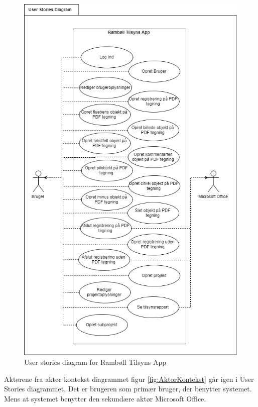 \begin{figure}[H]
	\centering
	\includegraphics[width=0.6\linewidth]{FunktionelleKrav/UserStorieDiagram}
	\caption{User stories diagram for Rambøll Tilsyns App}
	\label{fig:Userstoriediagram}
\end{figure}

Aktørene fra aktør kontekst diagrammet figur \ref{fig:AktorKontekst} går igen i User Stories diagrammet. Det er brugeren som primær bruger, der benytter systemet. Mens at systemet benytter den sekundære aktør Microsoft Office.

\clearpage

